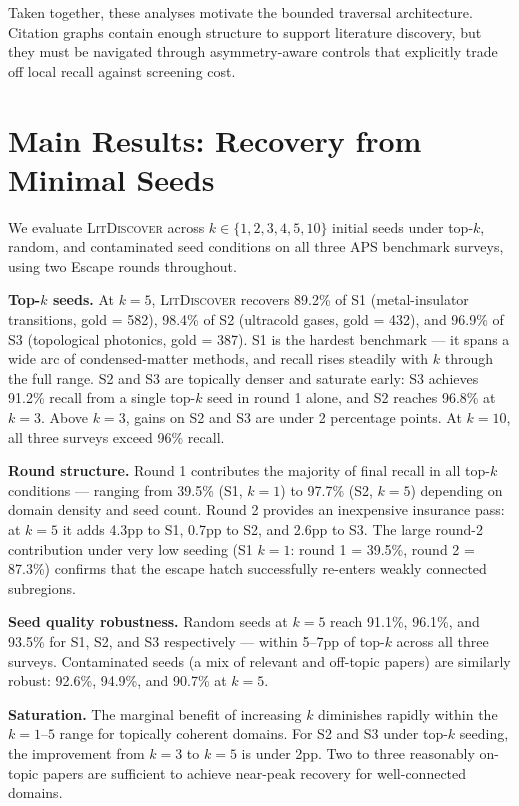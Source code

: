 \documentclass[12pt]{article}
\newcommand{\ldiscover}{\textsc{LitDiscover}}
\begin{document}
Taken together, these analyses motivate the bounded traversal architecture. Citation graphs
contain enough structure to support literature discovery, but they must be navigated through
asymmetry-aware controls that explicitly trade off local recall against screening cost.

\section{Main Results: Recovery from Minimal Seeds}

We evaluate \ldiscover{} across $k \in \{1,2,3,4,5,10\}$ initial seeds under top-$k$,
random, and contaminated seed conditions on all three APS benchmark surveys, using two
Escape rounds throughout.

\textbf{Top-$k$ seeds.} At $k = 5$, \ldiscover{} recovers 89.2\% of S1 (metal-insulator
transitions, gold = 582), 98.4\% of S2 (ultracold gases, gold = 432), and 96.9\% of S3
(topological photonics, gold = 387). S1 is the hardest benchmark --- it spans a wide arc of
condensed-matter methods, and recall rises steadily with $k$ through the full range. S2 and
S3 are topically denser and saturate early: S3 achieves 91.2\% recall from a single top-$k$
seed in round 1 alone, and S2 reaches 96.8\% at $k = 3$. Above $k = 3$, gains on S2 and S3
are under 2 percentage points. At $k = 10$, all three surveys exceed 96\% recall.

\textbf{Round structure.} Round 1 contributes the majority of final recall in all top-$k$
conditions --- ranging from 39.5\% (S1, $k = 1$) to 97.7\% (S2, $k = 5$) depending on
domain density and seed count. Round 2 provides an inexpensive insurance pass: at $k = 5$
it adds 4.3pp to S1, 0.7pp to S2, and 2.6pp to S3. The large round-2 contribution under
very low seeding (S1 $k = 1$: round 1 = 39.5\%, round 2 = 87.3\%) confirms that the escape
hatch successfully re-enters weakly connected subregions.

\textbf{Seed quality robustness.} Random seeds at $k = 5$ reach 91.1\%, 96.1\%, and 93.5\%
for S1, S2, and S3 respectively --- within 5--7pp of top-$k$ across all three surveys.
Contaminated seeds (a mix of relevant and off-topic papers) are similarly robust: 92.6\%,
94.9\%, and 90.7\% at $k = 5$.

\textbf{Saturation.} The marginal benefit of increasing $k$ diminishes rapidly within the
$k = 1$--$5$ range for topically coherent domains. For S2 and S3 under top-$k$ seeding,
the improvement from $k = 3$ to $k = 5$ is under 2pp. Two to three reasonably on-topic
papers are sufficient to achieve near-peak recovery for well-connected domains.
\end{document}
